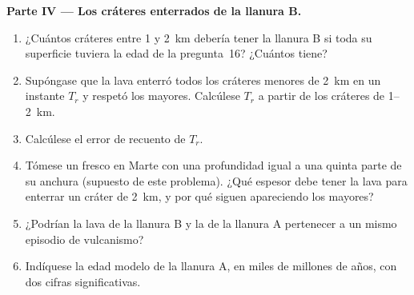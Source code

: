 \begin{problem}
\medskip\noindent\textbf{Parte IV --- Los cráteres enterrados de la llanura B.}
\begin{enumerate}[resume]
\item ¿Cuántos cráteres entre \num{1} y \qty{2}{km} debería tener la llanura B si
  toda su superficie tuviera la edad de la pregunta~16? ¿Cuántos tiene?
\item Supóngase que la lava enterró todos los cráteres menores de \qty{2}{km} en
  un instante $T_r$ y respetó los mayores. Calcúlese $T_r$ a partir de los
  cráteres de \num{1}--\qty{2}{km}.
\item Calcúlese el error de recuento de $T_r$.
\item Tómese un  fresco en Marte con una profundidad igual a una quinta
  parte de su anchura (supuesto de este problema). ¿Qué espesor debe tener la lava para
  enterrar un cráter de \qty{2}{km}, y por qué siguen apareciendo los mayores?
\item ¿Podrían la lava de la llanura B y la de la llanura A pertenecer a un mismo episodio
  de vulcanismo?
\item Indíquese la edad modelo de la llanura A, en miles de millones de años,
  con dos cifras significativas.
\end{enumerate}
\end{problem}
